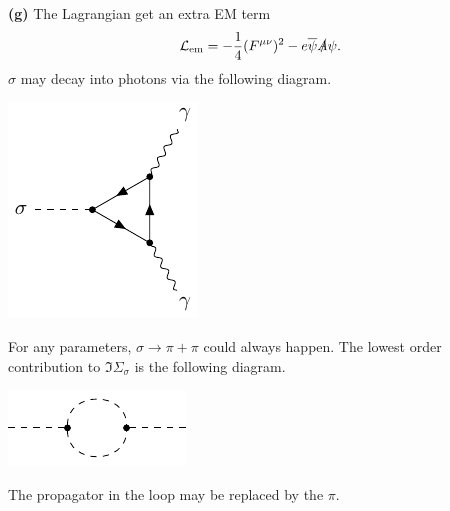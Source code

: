\documentclass{article}
\makeatletter
\newcommand*{\shifttext}[1]{%
  \settowidth{\@tempdima}{#1}%
  \hspace{-\@tempdima}#1%
}
\newcommand{\plabel}[1]{%
\shifttext{\textbf{#1}\quad}%
}
\makeatother
\begin{document}
\plabel{(g)}%
The Lagrangian get an extra EM term
\[ \mathcal{L}_{\mathrm{em}} = -\frac{1}{4}(F^{\mu\nu})^2 - e \overline{\psi} \slashed{A} \psi. \]
$\sigma$ may decay into photons via the following diagram.
\begin{center}
    \includegraphics{img/yukawa/sigma-life/sigma-gamma-gamma.pdf}
\end{center}
For any parameters, $\sigma\rightarrow \pi+\pi$ could always happen.
The lowest order contribution to $\Im \Sigma_\sigma$ is the following diagram.
\begin{center}
    \includegraphics{img/yukawa/1pi/sigma-sigma/sigma-sigma.pdf}
\end{center}
The propagator in the loop may be replaced by the $\pi$.
\end{document}
